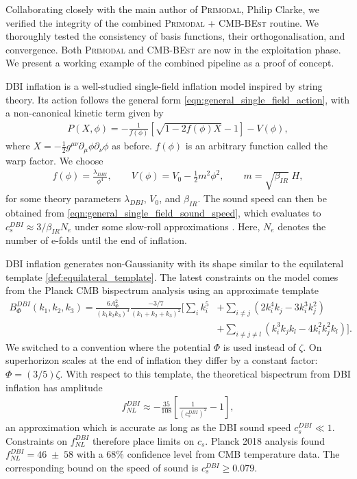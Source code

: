 Collaborating closely with the main author of \textsc{Primodal}, Philip Clarke, we verified the integrity of the combined \textsc{Primodal} + \textsc{CMB-BEst} routine. We thoroughly tested the consistency of basis functions, their orthogonalisation, and convergence. Both \textsc{Primodal} and \textsc{CMB-BEst} are now in the exploitation phase. We present a working example of the combined pipeline as a proof of concept.

DBI inflation \cite{Silverstein2004dbi,Alishahiha2004dbi,Chen2005runningdbi,Bean2008comparingdbi} is a well-studied single-field inflation model inspired by string theory. Its action follows the general form \eqref{eqn:general_single_field_action}, with a non-canonical kinetic term given by
\begin{align}
	P(X,\phi) = - \frac{1}{f(\phi)} \left[ \sqrt{1 - 2f(\phi)X} - 1 \right] - V(\phi),
\end{align}
where $X=-\frac{1}{2} g^{\mu\nu} \partial_\mu \phi \partial_\nu \phi$ as before. $f(\phi)$ is an arbitrary function called the warp factor. We choose
\begin{align}
	f(\phi) = \frac{\lambda_{DBI}}{\phi^4}, \qquad V(\phi) = V_0 - \frac{1}{2}m^2\phi^2, \qquad m = \sqrt{\beta_{IR}} \; H,
\end{align}
for some theory parameters $\lambda_{DBI}$, $V_0$, and $\beta_{IR}$. The sound speed can then be obtained from \eqref{eqn:general_single_field_sound_speed}, which evaluates to $c^{DBI}_s \approx 3/\beta_{IR} N_e$ under some slow-roll approximations \cite{Chen2005runningdbi}. Here, $N_e$ denotes the number of e-folds until the end of inflation.

DBI inflation generates non-Gaussianity with its shape similar to the equilateral template \eqref{def:equilateral_template}. The latest constraints on the model comes from the Planck CMB bispectrum analysis using an approximate template 
\begin{align}
	B_\Phi^{DBI}(k_1,k_2,k_3) = \frac{6A_\Phi^2}{(k_1 k_2 k_3)^3} \frac{-3/7}{(k_1 + k_2 + k_3)^2} \bigg[ \sum_i k_i^5 &+ \sum_{i\neq j} (2k_i^4 k_j - 3k_i^3 k_j^2)  \nonumber \\
	&+ \sum_{i\neq j\neq l} (k_i^3 k_j k_l - 4k_i^2 k_j^2 k_l) \bigg]. \label{eqn:dbi_bispectrum_template}
\end{align}
We switched to a convention where the potential $\Phi$ is used instead of $\zeta$. On superhorizon scales at the end of inflation they differ by a constant factor: $\Phi = (3/5)\zeta$. With respect to this template, the theoretical bispectrum from DBI inflation has amplitude
\begin{align}
	f_{NL}^{DBI} \approx - \frac{35}{108} \left[ \frac{1}{\left( c^{DBI}_s \right)^2} - 1 \right], \label{eqn:DBI_fNL_and_sound_speed}
\end{align}
an approximation which is accurate as long as the DBI sound speed $c^{DBI}_s \ll 1$. Constraints on $f_{NL}^{DBI}$ therefore place limits on $c_s$. Planck 2018 analysis \cite{PlanckCollaboration2018} found $f_{NL}^{DBI} = 46 \;\pm\; 58$ with a 68\% confidence level from CMB temperature data. The corresponding bound on the speed of sound is $c^{DBI}_s \ge 0.079$.


